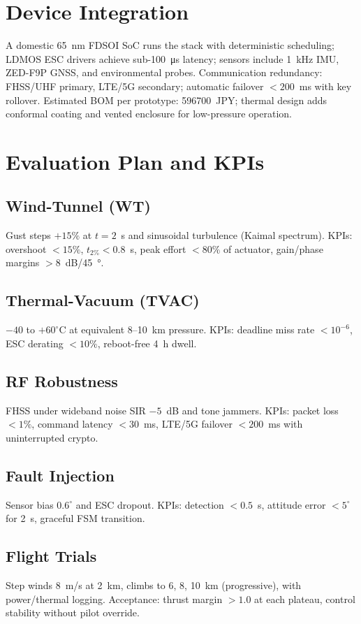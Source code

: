 \documentclass[conference]{IEEEtran}
\begin{document}
\section{Device Integration}
A domestic \SI{65}{nm} FDSOI SoC runs the stack with deterministic scheduling; LDMOS ESC drivers achieve sub-\SI{100}{\micro\second} latency; sensors include 1~kHz IMU, ZED-F9P GNSS, and environmental probes. Communication redundancy: FHSS/UHF primary, LTE/5G secondary; automatic failover $<200$~ms with key rollover. Estimated BOM per prototype: \SI{596700}{JPY}; thermal design adds conformal coating and vented enclosure for low-pressure operation.

\section{Evaluation Plan and KPIs}
\subsection{Wind-Tunnel (WT)}
Gust steps $+15\%$ at $t=2$~s and sinusoidal turbulence (Kaimal spectrum). KPIs: overshoot $<15\%$, $t_{2\%}<0.8$~s, peak effort $<80\%$ of actuator, gain/phase margins $>8$~dB/\SI{45}{\degree}.

\subsection{Thermal-Vacuum (TVAC)}
$-40$ to $+60^\circ$C at equivalent 8--10~km pressure. KPIs: deadline miss rate $<10^{-6}$, ESC derating $<10\%$, reboot-free 4~h dwell.

\subsection{RF Robustness}
FHSS under wideband noise SIR $-5$~dB and tone jammers. KPIs: packet loss $<1\%$, command latency $<30$~ms, LTE/5G failover $<200$~ms with uninterrupted crypto.

\subsection{Fault Injection}
Sensor bias $0.6^\circ$ and ESC dropout. KPIs: detection $<0.5$~s, attitude error $<5^\circ$ for 2~s, graceful FSM transition.

\subsection{Flight Trials}
Step winds \SI{8}{m/s} at 2~km, climbs to 6, 8, 10~km (progressive), with power/thermal logging. Acceptance: thrust margin $>1.0$ at each plateau, control stability without pilot override.
\end{document}
